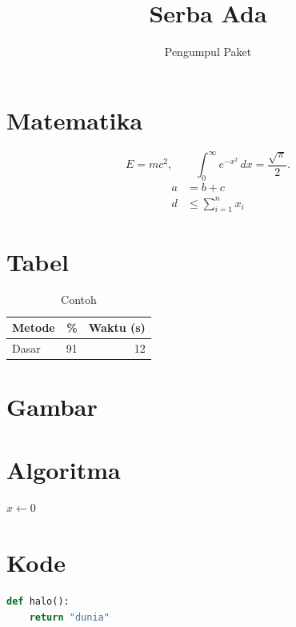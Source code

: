 \documentclass[11pt,a4paper]{article}
\title{Serba Ada}
\author{Pengumpul Paket}
\begin{document}
\maketitle
\tableofcontents

\section{Matematika}
\begin{equation}
  E = mc^2, \qquad \int_0^\infty e^{-x^2}\,dx = \frac{\sqrt{\pi}}{2}.
\end{equation}
\begin{align}
  a &= b + c \\
  d &\le \sum_{i=1}^{n} x_i
\end{align}

\section{Tabel}
\begin{table}[H]
  \centering
  \caption{Contoh}
  \begin{tabular}{lrr}
    \toprule
    Metode & \si{\percent} & Waktu (\si{\second}) \\
    \midrule
    Dasar & 91 & 12 \\
    \bottomrule
  \end{tabular}
\end{table}

\section{Gambar}


\section{Algoritma}
\begin{algorithm}
\caption{Contoh}
\begin{algorithmic}
\State $x \gets 0$
\end{algorithmic}
\end{algorithm}

\section{Kode}
\begin{lstlisting}[language=Python]
def halo():
    return "dunia"
\end{lstlisting}
\end{document}
